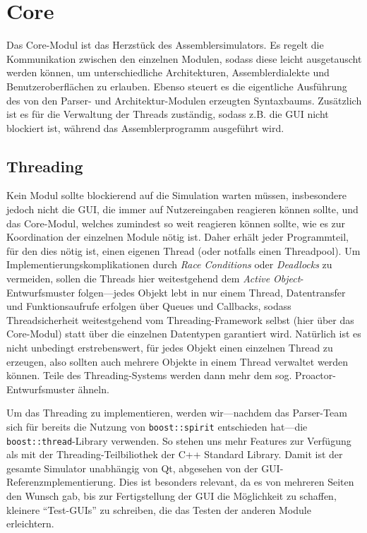 \chapter{Core}

Das Core-Modul ist das Herzstück des Assemblersimulators. Es regelt die Kommunikation zwischen den einzelnen Modulen, sodass diese leicht ausgetauscht werden können, um unterschiedliche Architekturen, Assemblerdialekte und Benutzeroberflächen zu erlauben. Ebenso steuert es die eigentliche Ausführung des von den Parser- und Architektur-Modulen erzeugten Syntaxbaums. Zusätzlich ist es für die Verwaltung der Threads zuständig, sodass z.B. die GUI nicht blockiert ist, während das Assemblerprogramm ausgeführt wird.

\section{Threading}

Kein Modul sollte blockierend auf die Simulation warten müssen, insbesondere jedoch nicht die GUI, die immer auf Nutzereingaben reagieren können sollte, und das Core-Modul, welches zumindest so weit reagieren können sollte, wie es zur Koordination der einzelnen Module nötig ist.
Daher erhält jeder Programmteil, für den dies nötig ist, einen eigenen Thread (oder notfalls einen Threadpool). Um Implementierungskomplikationen durch \textit{Race Conditions} oder \textit{Deadlocks} zu vermeiden, sollen die Threads hier weitestgehend dem \textit{Active Object}-Entwurfsmuster folgen---jedes Objekt lebt in nur einem Thread, Datentransfer und Funktionsaufrufe erfolgen über Queues und Callbacks, sodass Threadsicherheit weitestgehend vom Threading-Framework selbst (hier über das Core-Modul) statt über die einzelnen Datentypen garantiert wird. Natürlich ist es nicht unbedingt erstrebenswert, für jedes Objekt einen einzelnen Thread zu erzeugen, also sollten auch mehrere Objekte in einem Thread verwaltet werden können. Teile des Threading-Systems werden dann mehr dem sog. Proactor-Entwurfsmuster ähneln.

Um das Threading zu implementieren, werden wir---nachdem das Parser-Team sich für bereits die Nutzung von \lstinline[style=C++]!boost::spirit! entschieden hat---die \lstinline[style=C++]!boost::thread!-Library verwenden. So stehen uns mehr Features zur Verfügung als mit der Threading-Teilbiliothek der C++ Standard Library.
Damit ist der gesamte Simulator unabhängig von Qt, abgesehen von der GUI-Referenzmplementierung. Dies ist besonders relevant, da es von mehreren Seiten den Wunsch gab, bis zur Fertigstellung der GUI die Möglichkeit zu schaffen, kleinere ``Test-GUIs'' zu schreiben, die das Testen der anderen Module erleichtern.

